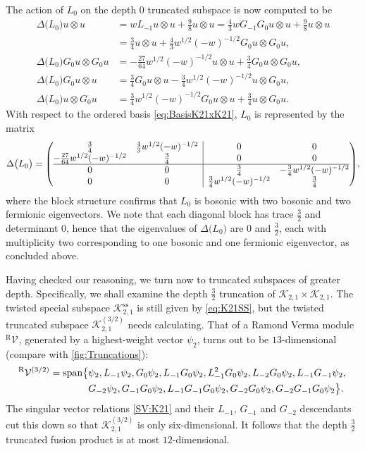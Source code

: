 \documentclass[a4paper,reqno,12pt]{report}
\makeatletter
\theoremstyle{definition}
\numberwithin{equation}{section}
\newenvironment{amatrix}[1]{\left( \begin{array}{@{}#1@{}}}{\end{array} \right)}
\let\originalleft\left     %
\let\originalright\right
\renewcommand{\left}{\mathopen{}\mathclose\bgroup\originalleft}
\renewcommand{\right}{\aftergroup\egroup\originalright}
\newcommand{\Ver}[1]{\mathcal{V}_{#1}}       %
\newcommand{\Kac}[1]{\mathcal{K}_{#1}}       %
\newcommand{\spsub}[1]{#1^{\text{ss}}}       %
\newcommand{\fuse}{\mathbin{\times}}                                            %
\newcommand{\coproductsymb}{\Delta}                                                %
\newcommand{\coproduct}[1]{\coproductsymb \bigl( #1 \bigr)}                        %
\newcommand{\hw}{highest-weight}
\newcommand{\sv}{singular vector}
\DeclareMathOperator{\vspn}{span}
\theoremstyle{plain}
\newcommand{\hwv}{\hw{} vector}
\newcommand{\RVer}[1]{{}^{\text{R}}\Ver{#1}}       %
\makeatother
\begin{document}
The action of $L_0$ on the depth $0$ truncated subspace is now computed to be
\begin{equation}
\begin{aligned}
\coproduct{L_0} u \otimes u &= w L_{-1} u \otimes u + \frac{9}{8} u\otimes u = \frac{4}{3} w G_{-1}G_0 u\otimes u + \frac{9}{8} u\otimes u \\
&= \frac{3}{4} u\otimes u + \frac{4}{3} w^{1/2}(-w)^{-1/2} G_0 u\otimes G_0 u, \\
\coproduct{L_0} G_0 u \otimes G_0 u &= -\frac{27}{64} w^{1/2}(-w)^{-1/2} u \otimes u + \frac{3}{4} G_0 u \otimes G_0 u, \\
\coproduct{L_0} G_0 u \otimes u &= \frac{3}{4} G_0 u \otimes  u -\frac{3}{4} w^{1/2}(-w)^{-1/2} u \otimes G_0 u, \\
\coproduct{L_0} u \otimes G_0 u &= \frac{3}{4} w^{1/2}(-w)^{-1/2} G_{0} u \otimes u + \frac{3}{4} u \otimes G_0 u.
\end{aligned}
\end{equation}
With respect to the ordered basis \eqref{eq:BasisK21xK21}, $L_0$ is represented by the matrix
\begin{equation}
\coproduct{L_0} = 
\begin{amatrix}{cc|cc}
\frac{3}{4} & \frac{4}{3} w^{1/2}(-w)^{-1/2} & 0 & 0 \\
-\frac{27}{64} w^{1/2}(-w)^{-1/2} & \frac{3}{4} & 0 & 0 \\
\hline
0 & 0 & \frac{3}{4} & -\frac{3}{4}w^{1/2}(-w)^{-1/2} \\
0 & 0 & \frac{3}{4} w^{1/2}(-w)^{-1/2} & \frac{3}{4}
\end{amatrix}
,
\end{equation}
where the block structure confirms that $L_0$ is bosonic with two bosonic and two fermionic eigenvectors.  We note that each diagonal block has trace $\frac{3}{2}$ and determinant $0$, hence that the eigenvalues of $\coproduct{L_0}$ are $0$ and $\frac{3}{2}$, each with multiplicity two corresponding to one bosonic and one fermionic eigenvector, as concluded above.

Having checked our reasoning, we turn now to truncated subspaces of greater depth.  Specifically, we shall examine the depth $\frac{3}{2}$ truncation of $\Kac{2,1} \fuse \Kac{2,1}$.  The twisted special subspace $\spsub{\Kac{2,1}}$ is still given by \eqref{eq:K21SS}, but the twisted truncated subspace $\Kac{2,1}^{(3/2)}$ needs calculating.  That of a Ramond Verma module $\RVer{}$, generated by a \hwv{} $\psi_2$, turns out to be $13$-dimensional (compare with \cref{fig:Truncations}):
\begin{align}
\RVer{}^{(3/2)} = \vspn &\bigl\{ \psi_2, L_{-1} \psi_2, G_0 \psi_2, L_{-1} G_0 \psi_2, L_{-1}^2 G_0 \psi_2, L_{-2} G_0 \psi_2, L_{-1} G_{-1} \psi_2, \bigr. \notag \\
&\phantom{\big\{} \bigl. G_{-2} \psi_2, G_{-1} G_0 \psi_2, L_{-1} G_{-1} G_0 \psi_2, G_{-2} G_0 \psi_2, G_{-2} G_{-1} G_0 \psi_2 \bigr\}.
\end{align}
The \sv{} relations \eqref{SV:K21} and their $L_{-1}$, $G_{-1}$ and $G_{-2}$ descendants cut this down so that $\Kac{2,1}^{(3/2)}$ is only six-dimensional.  It follows that the depth $\frac{3}{2}$ truncated fusion product is at most $12$-dimensional.
\end{document}

